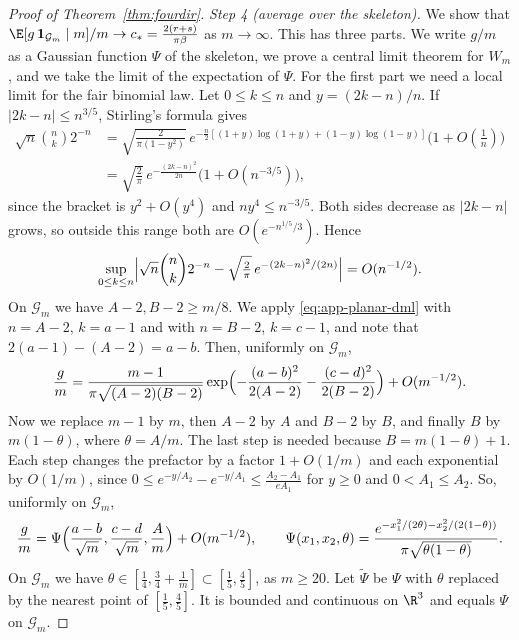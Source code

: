 \begin{proof}[Proof of Theorem~\ref{thm:fourdir}]
\emph{Step 4 (average over the skeleton).} We show that
$\E[g\,\mathbf 1_{\mathcal G_m}\mid m]/m\to c_*=\frac{2(r+s)}{\pi\beta}$ as $m\to\infty$. This has
three parts. We write $g/m$ as a Gaussian function $\Psi$ of the skeleton, we prove a central limit
theorem for $W_m$, and we take the limit of the expectation of $\Psi$. For the first part we
need a local limit for the fair binomial law. Let $0\le k\le n$ and $y=(2k-n)/n$. If
$\lvert2k-n\rvert\le n^{3/5}$, Stirling's formula gives
\begin{align*}
 \sqrt n\binom nk2^{-n}&=\sqrt{\frac2{\pi(1-y^2)}}\,
 e^{-\frac n2[(1+y)\log(1+y)+(1-y)\log(1-y)]}\bigl(1+O(\tfrac1n)\bigr)\\
 &=\sqrt{\frac2\pi}\,e^{-\frac{(2k-n)^2}{2n}}\bigl(1+O(n^{-3/5})\bigr),
\end{align*}
since the bracket is $y^2+O(y^4)$ and $ny^4\le n^{-3/5}$. Both sides decrease as $\lvert2k-n\rvert$
grows, so outside this range both are $O(e^{-n^{1/5}/3})$. Hence
\begin{equation}\label{eq:app-planar-dml}
 \sup_{0\le k\le n}\Bigl\lvert\sqrt n\binom nk2^{-n}-\sqrt{\tfrac2\pi}\,e^{-(2k-n)^2/(2n)}\Bigr\rvert
 =O(n^{-1/2}).
\end{equation}
On $\mathcal G_m$ we have $A-2,B-2\ge m/8$. We apply \eqref{eq:app-planar-dml} with $n=A-2$,
$k=a-1$ and with $n=B-2$, $k=c-1$, and note that $2(a-1)-(A-2)=a-b$. Then, uniformly on
$\mathcal G_m$,
\[
 \frac gm=\frac{m-1}{\pi\sqrt{(A-2)(B-2)}}
 \exp\Bigl(-\frac{(a-b)^2}{2(A-2)}-\frac{(c-d)^2}{2(B-2)}\Bigr)+O(m^{-1/2}).
\]
Now we replace $m-1$ by $m$, then $A-2$ by $A$ and $B-2$ by $B$, and finally $B$ by $m(1-\theta)$,
where $\theta=A/m$. The last step is needed because $B=m(1-\theta)+1$. Each step changes the
prefactor by a factor $1+O(1/m)$ and each exponential by $O(1/m)$, since
$0\le e^{-y/A_2}-e^{-y/A_1}\le\frac{A_2-A_1}{eA_1}$ for $y\ge0$ and $0<A_1\le A_2$. So, uniformly on
$\mathcal G_m$,
\[
 \frac gm=\Psi\Bigl(\frac{a-b}{\sqrt m},\frac{c-d}{\sqrt m},\frac Am\Bigr)+O(m^{-1/2}),\qquad
 \Psi(x_1,x_2,\theta)=\frac{e^{-x_1^2/(2\theta)-x_2^2/(2(1-\theta))}}{\pi\sqrt{\theta(1-\theta)}}.
\]
On $\mathcal G_m$ we have $\theta\in[\frac14,\frac34+\frac1m]\subset[\frac15,\frac45]$, as $m\ge20$.
Let $\tilde\Psi$ be $\Psi$ with $\theta$ replaced by the nearest point of $[\frac15,\frac45]$. It is
bounded and continuous on $\R^3$ and equals $\Psi$ on $\mathcal G_m$.


\end{proof}
